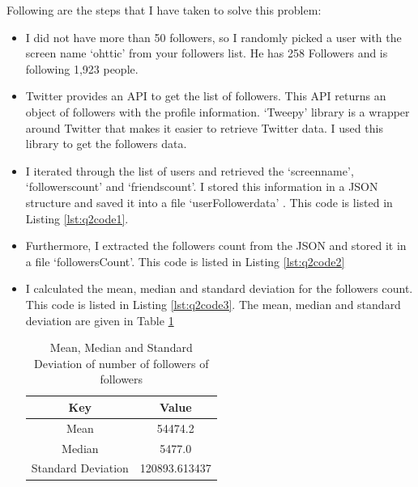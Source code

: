 Following are the steps that I have taken to solve this problem:
\begin{itemize}
\item I did not have more than 50 followers, so I randomly picked a user with the screen name `ohttic' from your followers list. He has 258 Followers and is following 1,923 people.
\item Twitter provides an API to get the list of followers. This API returns an object of followers with the profile information. `Tweepy' library is a wrapper around Twitter that makes it easier to retrieve Twitter data. I used this library to get the followers data.
\item I iterated through the list of users and retrieved the `screen\textunderscore name', `followers\textunderscore count' and `friends\textunderscore count'. I stored this information in a JSON structure and saved it into a file `userFollowerdata' . This code is listed in Listing \ref{lst:q2code1}.
\item Furthermore, I extracted the followers count from the JSON and stored it in a file `followersCount'. This code is listed in Listing \ref{lst:q2code2}
\item I calculated the mean, median and standard deviation for the followers count. This code is listed in Listing \ref{lst:q2code3}. The mean, median and standard deviation are given in Table \ref{Table:q2table1}

\begin{table}

\caption{Mean, Median and Standard Deviation of number of followers of followers}
\label{Table:q2table1}
\begin{center}
\begin{tabular}{| c | c |}
\hline
Key & Value \\ \hline

Mean & 54474.2 \\ \hline
Median & 5477.0 \\ \hline
Standard Deviation & 120893.613437 \\ \hline

\hline

\end{tabular}
\end{center}
\end{table}


\end{itemize}
